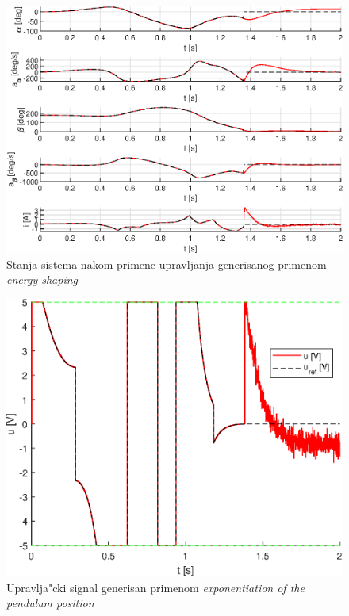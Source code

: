\documentclass[a4paper,11pt]{article}
\theoremstyle{definition} \newtheorem{deff}{Definicija}[section]
\theoremstyle{definition} \newtheorem{prim}[deff]{Primer}
\theoremstyle{plain} \newtheorem{teor}[deff]{Teorema}
\begin{document}
	\begin{figure}[!h]
		\centering
		\includegraphics[width=.9\linewidth]{slike/States_EnergyShaping_trajectory.eps}
		\caption{Stanja sistema nakom primene upravljanja generisanog primenom \emph{energy shaping}}
		\label{fig:traj_energysh}
	\end{figure}
	\clearpage
	
	\begin{figure}[!h]
		\centering
		\includegraphics[width=0.6\linewidth]{slike/Control_ExpControl_trajectory.eps}
		\caption{Upravlja"cki signal generisan primenom \emph{exponentiation of the pendulum position}}
		\label{fig:cntrl_energyexp}
	\end{figure}
	
\end{document}
